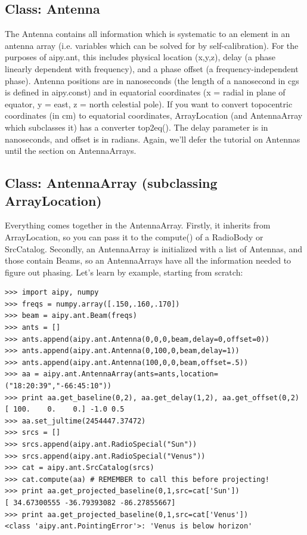 \subsection{Class: Antenna}

The Antenna contains all information which is systematic to an element in
an antenna array (i.e. variables which can be solved for by self-calibration).
For the purposes of aipy.ant, this includes physical location (x,y,z),
delay (a phase linearly dependent with frequency), and a phase offset 
(a frequency-independent phase).  Antenna positions are in
nanoseconds (the length of a nanosecond in cgs is defined in aipy.const)
and in equatorial coordinates (x = radial in plane of equator,
y = east, z = north celestial pole).  If you want to convert topocentric
coordinates (in cm) to equatorial coordinates, ArrayLocation (and
AntennaArray which subclasses it) has a converter top2eq().  The delay
parameter is in nanoseconds, and offset is in radians.  Again, we'll
defer the tutorial on Antennas until the section on AntennaArrays.

\subsection{Class: AntennaArray (subclassing ArrayLocation)}

Everything comes together in the AntennaArray.  Firstly, it inherits from
ArrayLocation, so you can pass it to the compute() of a RadioBody or
SrcCatalog.  Secondly, an AntennaArray is initialized with a list of
Antennas, and those contain Beams, so an AntennaArrays have all the information
needed to figure out phasing.  Let's learn by example, starting from scratch:

\begin{verbatim}
>>> import aipy, numpy
>>> freqs = numpy.array([.150,.160,.170])
>>> beam = aipy.ant.Beam(freqs)
>>> ants = []
>>> ants.append(aipy.ant.Antenna(0,0,0,beam,delay=0,offset=0))
>>> ants.append(aipy.ant.Antenna(0,100,0,beam,delay=1))
>>> ants.append(aipy.ant.Antenna(100,0,0,beam,offset=.5))
>>> aa = aipy.ant.AntennaArray(ants=ants,location=("18:20:39","-66:45:10"))
>>> print aa.get_baseline(0,2), aa.get_delay(1,2), aa.get_offset(0,2)
[ 100.    0.    0.] -1.0 0.5
>>> aa.set_jultime(2454447.37472)
>>> srcs = []
>>> srcs.append(aipy.ant.RadioSpecial("Sun"))
>>> srcs.append(aipy.ant.RadioSpecial("Venus"))
>>> cat = aipy.ant.SrcCatalog(srcs)
>>> cat.compute(aa) # REMEMBER to call this before projecting!
>>> print aa.get_projected_baseline(0,1,src=cat['Sun'])
[ 34.67300555 -36.79393082 -86.27855667]
>>> print aa.get_projected_baseline(0,1,src=cat['Venus'])
<class 'aipy.ant.PointingError'>: 'Venus is below horizon'
\end{verbatim}

